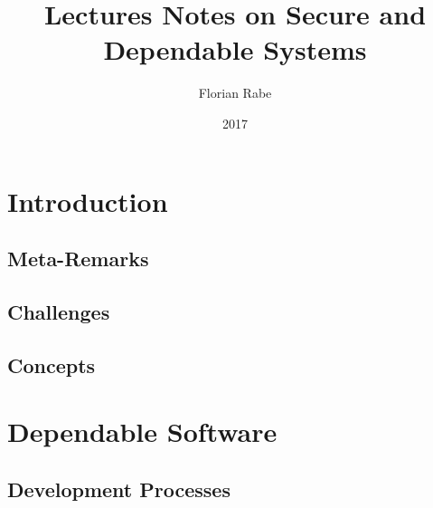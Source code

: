 \documentclass{book}
\title{Lectures Notes on Secure and Dependable Systems}
\author{Florian Rabe}
\date{2017}
\begin{document}
\maketitle

\tableofcontents
\newpage

\part{Introduction} %

 \chapter{Meta-Remarks}
  

 \chapter{Challenges}
   

  \chapter{Concepts} %
   

\part{Dependable Software}

  \chapter{Development Processes} %
        
\end{document}
